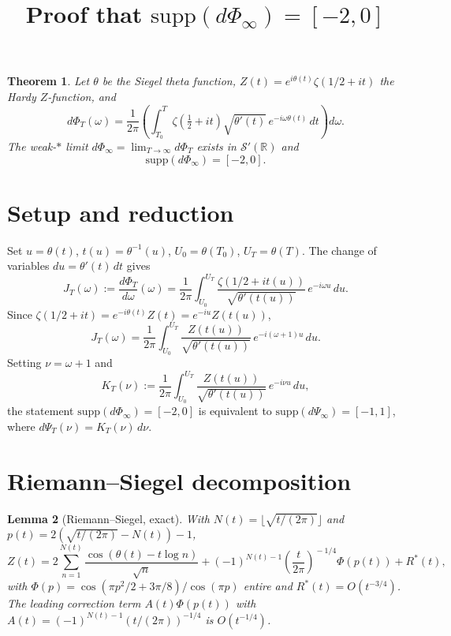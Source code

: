 \documentclass[11pt]{article}
\title{Proof that $\mathrm{supp}(d\Phi_\infty)=[-2,0]$}
\author{}
\date{}
\newtheorem{theorem}{Theorem}
\newtheorem{lemma}[theorem]{Lemma}
\theoremstyle{definition}
\theoremstyle{remark}
\begin{document}
\maketitle

\begin{theorem}\label{thm:main}
Let $\theta$ be the Siegel theta function, $Z(t)=e^{i\theta(t)}\zeta(1/2+it)$ the
Hardy $Z$-function, and
\[
  d\Phi_T(\omega)
  =\frac{1}{2\pi}\!\left(\int_{T_0}^{T}\!\zeta(\tfrac12+it)\sqrt{\theta'(t)}\,
    e^{-i\omega\theta(t)}\,dt\right)d\omega.
\]
The weak-$*$ limit $d\Phi_\infty=\lim_{T\to\infty}d\Phi_T$ exists in
$\mathcal{S}'(\mathbb{R})$ and
\[
  \mathrm{supp}(d\Phi_\infty)=[-2,0].
\]
\end{theorem}

\section{Setup and reduction}

Set $u=\theta(t)$, $t(u)=\theta^{-1}(u)$, $U_0=\theta(T_0)$,
$U_T=\theta(T)$.  The change of variables $du=\theta'(t)\,dt$ gives
\[
  J_T(\omega)
  :=\frac{d\Phi_T}{d\omega}(\omega)
  =\frac{1}{2\pi}\int_{U_0}^{U_T}
     \frac{\zeta(1/2+it(u))}{\sqrt{\theta'(t(u))}}\,e^{-i\omega u}\,du.
\]
Since $\zeta(1/2+it)=e^{-i\theta(t)}Z(t)=e^{-iu}Z(t(u))$,
\[
  J_T(\omega)
  =\frac{1}{2\pi}\int_{U_0}^{U_T}
     \frac{Z(t(u))}{\sqrt{\theta'(t(u))}}\,e^{-i(\omega+1)u}\,du.
\]
Setting $\nu=\omega+1$ and
\[
  K_T(\nu)
  :=\frac{1}{2\pi}\int_{U_0}^{U_T}
     \frac{Z(t(u))}{\sqrt{\theta'(t(u))}}\,e^{-i\nu u}\,du,
\]
the statement $\mathrm{supp}(d\Phi_\infty)=[-2,0]$ is equivalent to
$\mathrm{supp}(d\Psi_\infty)=[-1,1]$, where
$d\Psi_T(\nu)=K_T(\nu)\,d\nu$.

\section{Riemann--Siegel decomposition}

\begin{lemma}[Riemann--Siegel, exact]\label{lem:RS}
With $N(t)=\lfloor\sqrt{t/(2\pi)}\rfloor$ and
$p(t)=2(\sqrt{t/(2\pi)}-N(t))-1$,
\[
  Z(t)=2\sum_{n=1}^{N(t)}\frac{\cos(\theta(t)-t\log n)}{\sqrt{n}}
  +(-1)^{N(t)-1}\!\left(\frac{t}{2\pi}\right)^{\!-1/4}\!\Phi(p(t))
  +R^*(t),
\]
with $\Phi(p)=\cos(\pi p^2/2+3\pi/8)/\cos(\pi p)$ entire and
$R^*(t)=O(t^{-3/4})$.  The leading correction term $A(t)\Phi(p(t))$ with
$A(t)=(-1)^{N(t)-1}(t/(2\pi))^{-1/4}$ is $O(t^{-1/4})$.
\end{lemma}
\end{document}
